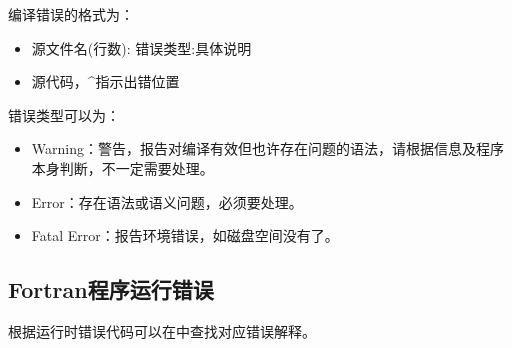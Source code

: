\documentclass[a4paper,12pt,english]{sphinxmanual}
\begin{document}
\sphinxAtStartPar
编译错误的格式为：
\begin{itemize}
\item {} 
\sphinxAtStartPar
源文件名(行数): 错误类型:具体说明

\item {} 
\sphinxAtStartPar
源代码，\textasciicircum{}指示出错位置

\end{itemize}

\sphinxAtStartPar
错误类型可以为：
\begin{itemize}
\item {} 
\sphinxAtStartPar
Warning：警告，报告对编译有效但也许存在问题的语法，请根据信息及程序本身判断，不一定需要处理。

\item {} 
\sphinxAtStartPar
Error：存在语法或语义问题，必须要处理。

\item {} 
\sphinxAtStartPar
Fatal Error：报告环境错误，如磁盘空间没有了。

\end{itemize}


\subsection{Fortran程序运行错误}
\label{\detokenize{compiler/intel:fortran}}
\sphinxAtStartPar
根据运行时错误代码可以在中查找对应错误解释。
\end{document}
